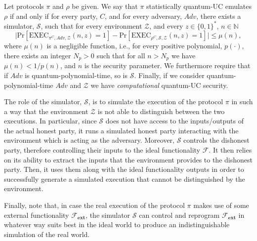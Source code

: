 \begin{definition}

Let protocols $\pi$ and $\rho$ be given. We say that $\pi$ statistically quantum-UC emulates $\rho$ if and only if for every party, $C$, and for every adversary, $Adv$, there exists a simulator, $\mathcal{S}$, such that for every environment $\mathcal{Z}$, and every $z\in\{0,1\}^*$, $n\in\mathbb{N}$
\begin{equation*}
    \big|\text{Pr}[\text{EXEC}_{\mathcal{\pi}^C, Adv, \mathcal{Z}} (n, z) = 1] - \text{Pr}[\text{EXEC}_{\rho^C, \mathcal{S}, \mathcal{Z}}(n, z) = 1]\big| \leq \mu(n),
\end{equation*}
 where $\mu(n)$ is a negligible function, i.e., for every positive polynomial, $p(\cdot)$, there exists an integer $N_p>0$ such that for all $n> N_p$ we have $\mu(n)<1/p(n)$, and $n$ is the security parameter. We furthermore require that if $Adv$ is quantum-polynomial-time, so is $\mathcal{S}$. Finally, if we consider quantum-polynomial-time $Adv$ and $\mathcal{Z}$ we have \textit{computational} quantum-UC security.
\label{def:statisticalquc}
\end{definition}



 The role of the simulator, $\mathcal{S}$, is to  simulate the execution of the protocol $\mathcal{\pi}$ in such a way that the environment $\mathcal{Z}$ is not able to distinguish between the two executions. 
In particular, since $\mathcal{S}$ does not have access to the inputs/outputs of the actual honest party, it runs a simulated honest party interacting with the environment which is acting as the adversary. Moreover, $\mathcal{S}$ controls the  dishonest party, therefore controlling their inputs to the ideal functionality $\mathcal{F}$. 
It then relies on its ability to extract the inputs  that the environment provides to the dishonest party. Then, it uses them along with the ideal functionality outputs in order to successfully generate a simulated execution that cannot be distinguished by the environment.

Finally, note that, in case the real execution of the protocol $\mathcal{\pi}$ makes use of some external functionality $\mathcal{F}_{\textbf{ext}}$, the simulator $\mathcal{S}$ can control and reprogram $\mathcal{F}_{\textbf{ext}}$ in whatever way suits best in the ideal world to produce an indistinguishable simulation of the real world.


